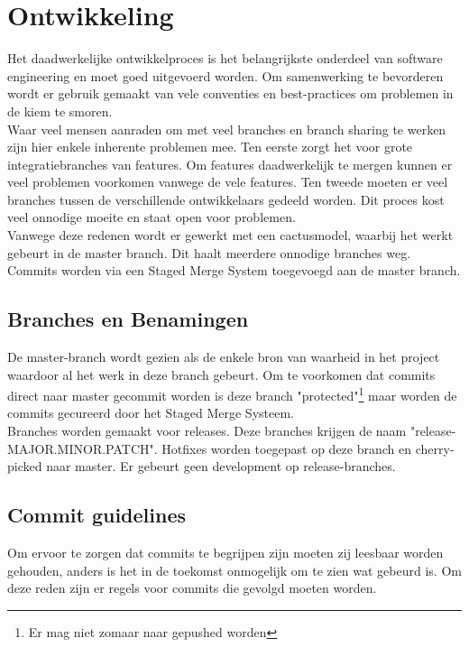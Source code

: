 \chapter{Ontwikkeling}

Het daadwerkelijke ontwikkelproces is het belangrijkste onderdeel van software engineering en moet goed uitgevoerd worden. Om samenwerking te bevorderen wordt er gebruik gemaakt van vele conventies en best-practices om problemen in de kiem te smoren. \\

Waar veel mensen aanraden om met veel branches en branch sharing te werken\cite{branch2} zijn hier enkele inherente problemen mee. Ten eerste zorgt het voor grote integratiebranches van features. Om features daadwerkelijk te mergen kunnen er veel problemen voorkomen vanwege de vele features. Ten tweede moeten er veel branches tussen de verschillende ontwikkelaars gedeeld worden. Dit proces kost veel onnodige moeite en staat open voor problemen.\cite{branch1} \\

Vanwege deze redenen wordt er gewerkt met een cactusmodel, waarbij het werkt gebeurt in de master branch. Dit haalt meerdere onnodige branches weg. Commits worden via een Staged Merge System toegevoegd aan de master branch. 

\section{Branches en Benamingen}

De master-branch wordt gezien als de enkele bron van waarheid in het project waardoor al het werk in deze branch gebeurt. Om te voorkomen dat commits direct naar master gecommit worden is deze branch "protected"\footnote{Er mag niet zomaar naar gepushed worden} maar worden de commits gecureerd door het Staged Merge Systeem. \\

Branches worden gemaakt voor releases. Deze branches krijgen de naam "release-MAJOR.MINOR.PATCH". Hotfixes worden toegepast op deze branch en cherry-picked naar master. Er gebeurt geen development op release-branches.

\section{Commit guidelines}

Om ervoor te zorgen dat commits te begrijpen zijn moeten zij leesbaar worden gehouden, anders is het in de toekomst onmogelijk om te zien wat gebeurd is. Om deze reden zijn er regels voor commits die gevolgd moeten worden. \\

